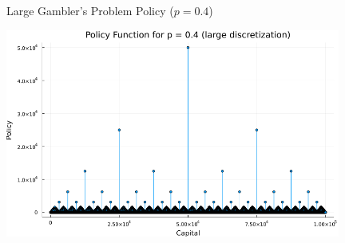 \documentclass{beamer}
\begin{document}
\begin{frame}{Large Gambler's Problem Policy ($p = 0.4$)}
\begin{center}
	\includegraphics[width=11cm]{gamblers_problem_policy_p04large.png}
	\end{center}
\end{frame}
\end{document}

